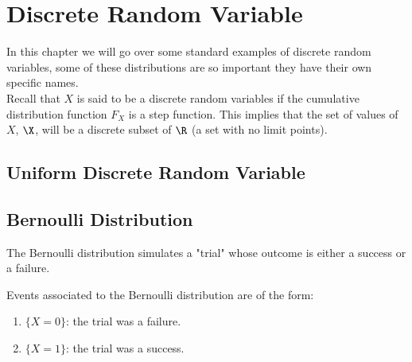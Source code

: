 \chapter[Discrete Random Variables]{Discrete Random Variable}
In this chapter we will go over some standard examples of discrete random variables, some of these distributions are so important they have their own specific names. 
\\

Recall that $X$ is said to be a discrete random variables if the cumulative distribution function $F_X$ is a step function. This implies that the set of values of $X$, $\X$, will be a discrete subset of $\R$ (a set with no limit points).

\section[Uniform Discrete Random Variable]{Uniform Discrete Random Variable}




\section[Bernoulli Distribution]{Bernoulli Distribution}
The Bernoulli distribution simulates a "trial" whose outcome is either a success or a failure. 





Events associated to the Bernoulli distribution are of the form:
\begin{enumerate}
    \item $\{X = 0\}$: the trial was a failure.
    \item $\{X =1\}$: the trial was a success. 
\end{enumerate}




